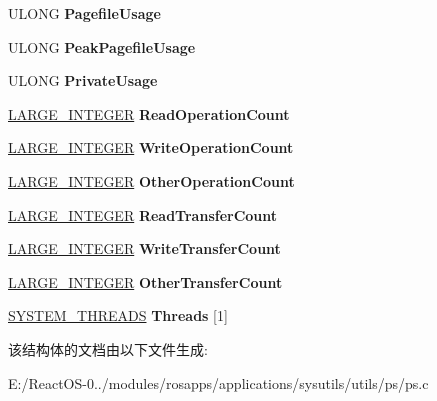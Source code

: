 \begin{DoxyCompactItemize}
U\+L\+O\+NG {\bfseries Pagefile\+Usage}
\item 
\mbox{\label{struct___s_y_s_t_e_m___p_r_o_c_e_s_s_e_s_a4905136f1c51cbe653a713d0603862a8}} 
U\+L\+O\+NG {\bfseries Peak\+Pagefile\+Usage}
\item 
\mbox{\label{struct___s_y_s_t_e_m___p_r_o_c_e_s_s_e_s_a529ddc41832963f8aa799eeb8ad91bdc}} 
U\+L\+O\+NG {\bfseries Private\+Usage}
\item 
\mbox{\label{struct___s_y_s_t_e_m___p_r_o_c_e_s_s_e_s_a4bbf106746a0690bced35dbaf9b13d4f}} 
\hyperlink{union___l_a_r_g_e___i_n_t_e_g_e_r}{L\+A\+R\+G\+E\+\_\+\+I\+N\+T\+E\+G\+ER} {\bfseries Read\+Operation\+Count}
\item 
\mbox{\label{struct___s_y_s_t_e_m___p_r_o_c_e_s_s_e_s_a99a09dd4af4ed8a6d041653826ede195}} 
\hyperlink{union___l_a_r_g_e___i_n_t_e_g_e_r}{L\+A\+R\+G\+E\+\_\+\+I\+N\+T\+E\+G\+ER} {\bfseries Write\+Operation\+Count}
\item 
\mbox{\label{struct___s_y_s_t_e_m___p_r_o_c_e_s_s_e_s_a0be384e5e72c973d893429421d319ee8}} 
\hyperlink{union___l_a_r_g_e___i_n_t_e_g_e_r}{L\+A\+R\+G\+E\+\_\+\+I\+N\+T\+E\+G\+ER} {\bfseries Other\+Operation\+Count}
\item 
\mbox{\label{struct___s_y_s_t_e_m___p_r_o_c_e_s_s_e_s_a13ddb61e3bda1bef4374e8129a34f581}} 
\hyperlink{union___l_a_r_g_e___i_n_t_e_g_e_r}{L\+A\+R\+G\+E\+\_\+\+I\+N\+T\+E\+G\+ER} {\bfseries Read\+Transfer\+Count}
\item 
\mbox{\label{struct___s_y_s_t_e_m___p_r_o_c_e_s_s_e_s_aab8f8c6126ff09629ec6d8694e44952f}} 
\hyperlink{union___l_a_r_g_e___i_n_t_e_g_e_r}{L\+A\+R\+G\+E\+\_\+\+I\+N\+T\+E\+G\+ER} {\bfseries Write\+Transfer\+Count}
\item 
\mbox{\label{struct___s_y_s_t_e_m___p_r_o_c_e_s_s_e_s_aabcb4d95d8242a6d43ce3df82661d848}} 
\hyperlink{union___l_a_r_g_e___i_n_t_e_g_e_r}{L\+A\+R\+G\+E\+\_\+\+I\+N\+T\+E\+G\+ER} {\bfseries Other\+Transfer\+Count}
\item 
\mbox{\label{struct___s_y_s_t_e_m___p_r_o_c_e_s_s_e_s_a657a38c81135761fff374fc5b5bfafcf}} 
\hyperlink{struct___s_y_s_t_e_m___t_h_r_e_a_d_s}{S\+Y\+S\+T\+E\+M\+\_\+\+T\+H\+R\+E\+A\+DS} {\bfseries Threads} \mbox{[}1\mbox{]}
\end{DoxyCompactItemize}


该结构体的文档由以下文件生成\+:\begin{DoxyCompactItemize}
\item 
E\+:/\+React\+O\+S-\/0../modules/rosapps/applications/sysutils/utils/ps/ps.\+c\end{DoxyCompactItemize}
